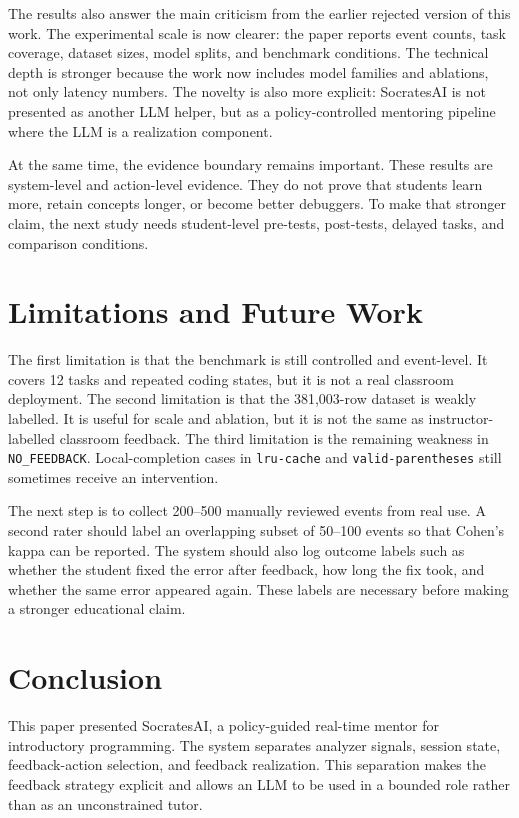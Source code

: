 \documentclass[conference]{IEEEtran}
\begin{document}
The results also answer the main criticism from the earlier rejected version of this work. The experimental scale is now clearer: the paper reports event counts, task coverage, dataset sizes, model splits, and benchmark conditions. The technical depth is stronger because the work now includes model families and ablations, not only latency numbers. The novelty is also more explicit: SocratesAI is not presented as another LLM helper, but as a policy-controlled mentoring pipeline where the LLM is a realization component.

At the same time, the evidence boundary remains important. These results are system-level and action-level evidence. They do not prove that students learn more, retain concepts longer, or become better debuggers. To make that stronger claim, the next study needs student-level pre-tests, post-tests, delayed tasks, and comparison conditions.

\section{Limitations and Future Work}

The first limitation is that the benchmark is still controlled and event-level. It covers 12 tasks and repeated coding states, but it is not a real classroom deployment. The second limitation is that the 381,003-row dataset is weakly labelled. It is useful for scale and ablation, but it is not the same as instructor-labelled classroom feedback. The third limitation is the remaining weakness in \texttt{NO\_FEEDBACK}. Local-completion cases in \texttt{lru-cache} and \texttt{valid-parentheses} still sometimes receive an intervention.

The next step is to collect 200--500 manually reviewed events from real use. A second rater should label an overlapping subset of 50--100 events so that Cohen's kappa can be reported. The system should also log outcome labels such as whether the student fixed the error after feedback, how long the fix took, and whether the same error appeared again. These labels are necessary before making a stronger educational claim.

\section{Conclusion}

This paper presented SocratesAI, a policy-guided real-time mentor for introductory programming. The system separates analyzer signals, session state, feedback-action selection, and feedback realization. This separation makes the feedback strategy explicit and allows an LLM to be used in a bounded role rather than as an unconstrained tutor.
\end{document}
